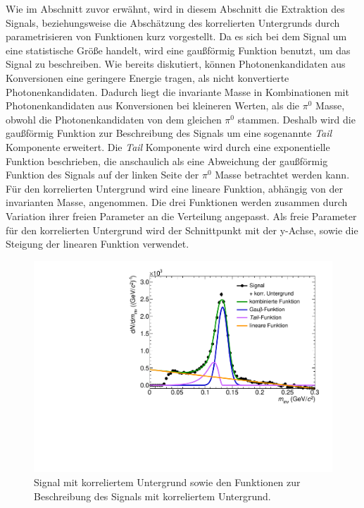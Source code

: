 Wie im Abschnitt zuvor erw\"ahnt, wird in diesem Abschnitt die Extraktion des Signals, beziehungsweise die Absch\"atzung des korrelierten Untergrunds durch parametrisieren von Funktionen kurz vorgestellt.
\newline
Da es sich bei dem Signal um eine statistische Gr\"o{\ss}e handelt, wird eine gau{\ss}f\"ormig Funktion benutzt, um das Signal zu beschreiben.
\newline
Wie bereits diskutiert, k\"onnen Photonenkandidaten aus Konversionen eine geringere Energie tragen, als nicht konvertierte Photonenkandidaten.
Dadurch liegt die invariante Masse in Kombinationen mit Photonenkandidaten aus Konversionen bei kleineren Werten, als die $\pi^{0}$ Masse, obwohl die Photonenkandidaten von dem gleichen $\pi^{0}$ stammen.
Deshalb wird die gau{\ss}f\"ormig Funktion zur Beschreibung des Signals um eine sogenannte \textit{Tail} Komponente erweitert.
Die \textit{Tail} Komponente wird durch eine exponentielle Funktion beschrieben, die anschaulich als eine Abweichung der gau{\ss}f\"ormig Funktion des Signals auf der linken Seite der $\pi^{0}$ Masse betrachtet werden kann.
\newline
F\"ur den korrelierten Untergrund wird eine lineare Funktion, abh\"angig von der invarianten Masse, angenommen.
\newline
Die drei Funktionen werden zusammen durch Variation ihrer freien Parameter an die Verteilung angepasst.
Als freie Parameter f\"ur den korrelierten Untergrund wird der Schnittpunkt mit der y-Achse, sowie die Steigung der linearen Funktion verwendet.
\begin{figure}[tp]
\centering
\includegraphics[width=.7\linewidth]{StandardParam.pdf}
\caption{Signal mit korreliertem Untergrund sowie den Funktionen zur Beschreibung des Signals mit korreliertem Untergrund.}
\label{figStandardParam}
\end{figure}
